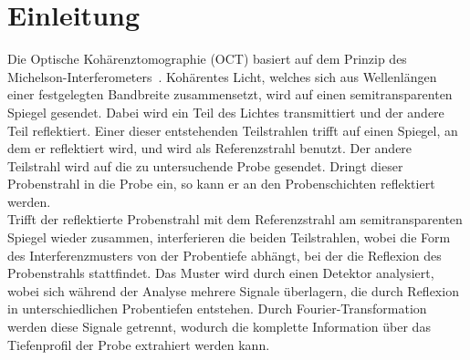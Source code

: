 \section{Einleitung}

Die Optische Kohärenztomographie (OCT) basiert auf dem Prinzip des Michelson-In\-ter\-fe\-ro\-me\-ters~\cite{OCT}. Kohärentes Licht, welches sich aus Wellenlängen einer festgelegten Bandbreite zusammensetzt, wird auf einen semitransparenten Spiegel gesendet.  Dabei wird ein Teil des Lichtes transmittiert und der andere Teil reflektiert. Einer dieser entstehenden Teilstrahlen trifft auf einen Spiegel, an dem er reflektiert wird, und wird als Referenzstrahl benutzt. Der andere Teilstrahl wird auf die zu untersuchende Probe gesendet. Dringt dieser Probenstrahl in die Probe ein, so kann er an den Probenschichten reflektiert werden. \\
Trifft der reflektierte Probenstrahl mit dem Referenzstrahl am semitransparenten Spiegel wieder zusammen, interferieren die beiden Teilstrahlen, wobei die Form des Interferenzmusters von der Probentiefe abhängt, bei der die Reflexion des Probenstrahls stattfindet. Das Muster wird durch einen Detektor analysiert, wobei sich während der Analyse mehrere Signale überlagern, die durch Reflexion in unterschiedlichen Probentiefen entstehen. Durch Fourier-Transformation werden diese Signale getrennt, wodurch die komplette Information über das Tiefenprofil der Probe extrahiert werden kann. \\

